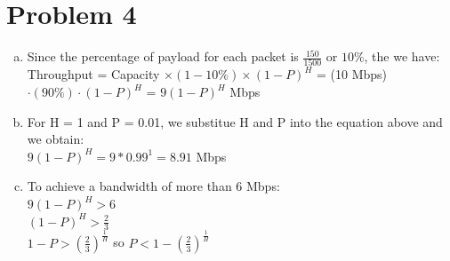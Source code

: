 \documentclass{article}   	                         %
\begin{document}
\section*{Problem 4}
\begin{enumerate}[(a)]
\item
Since the percentage of payload for each packet is $\frac{150}{1500}$ or $10\%$, the we have:\\
Throughput = Capacity $\times (1 - 10\%) \times (1 - P)^H$ = (10 Mbps) $\cdot (90\%) \cdot (1 - P)^H$ = $9 (1 - P)^H$ Mbps
\\
\item
For H = 1 and P = 0.01, we substitue H and P into the equation above and we obtain:\\
$9 (1 - P)^H = 9*0.99^1 = 8.91$ Mbps\\
\item
To achieve a bandwidth of more than 6 Mbps:\\
$9 (1 - P)^H > 6 $\\
$(1 - P)^H > \frac{2}{3}$\\
$1 - P > (\frac{2}{3})^{\frac{1}{H}}$
so $P < 1 - (\frac{2}{3})^{\frac{1}{H}}$
\end{enumerate}
\end{document}
